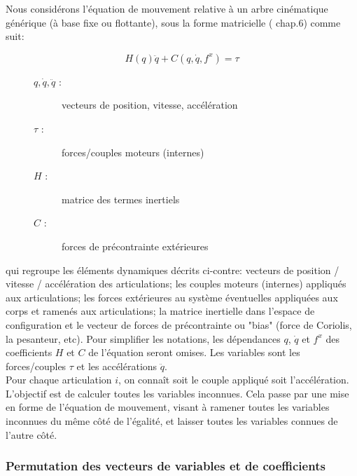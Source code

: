 \documentclass{report}
\begin{document}
Nous considérons l'équation de mouvement relative à un arbre cinématique générique (à base fixe ou flottante), sous la forme matricielle (\cite{bib_featherstone} chap.6) comme suit:

\begin{equation} \label{equ_equationMouvt}
H(q)\ddot{q} + C(q,\dot{q},f^x) = \tau
\end{equation}

\medskip

\begin{figure}
  \begin{flushright}
  \begin{minipage}[t]{0.45\textwidth}
  \begin{description}
    \item[$q, \dot{q}, \ddot{q}$ :] vecteurs de position, vitesse, accélération
    \item[$\tau$ :] forces/couples moteurs (internes)
    \item[$H$ :] matrice des termes inertiels
    \item[$C$ :] forces de précontrainte extérieures
  \end{description}
  \end{minipage}
  \end{flushright}
\end{figure}

qui regroupe les éléments dynamiques décrits ci-contre: vecteurs de position / vitesse / accélération des articulations; les couples moteurs (internes) appliqués aux articulations; les forces extérieures au système éventuelles appliquées aux corps et ramenés aux articulations; la matrice inertielle dans l'espace de configuration et le vecteur de forces de précontrainte ou "bias" (force de Coriolis, la pesanteur, etc).
Pour simplifier les notations, les dépendances $q$, $\dot{q}$ et $f^x$ des coefficients $H$ et $C$ de l'équation seront omises. Les variables sont les forces/couples $\tau$ et les accélérations $\ddot{q}$.\\
Pour chaque articulation $i$, on connaît soit le couple appliqué soit l'accélération. L'objectif est de calculer toutes les variables inconnues. Cela passe par une mise en forme de l'équation de mouvement, visant à ramener toutes les variables inconnues du même côté de l'égalité, et laisser toutes les variables connues de l'autre côté.

\subsubsection{Permutation des vecteurs de variables et de coefficients}
\end{document}
